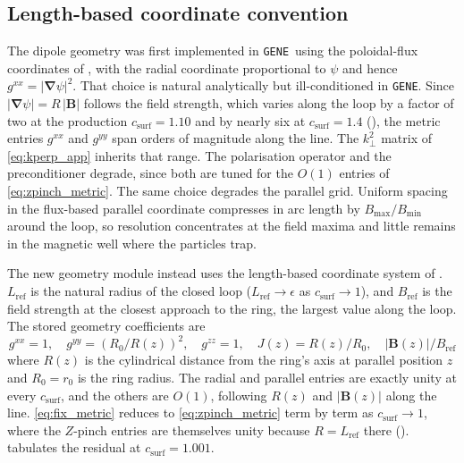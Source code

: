 \documentclass{jpp}
\newcommand{\order}[1]{O\left(#1\right)}
\newcommand{\bB}{\mathbf{B}}
\renewcommand{\vec}[1]{\boldsymbol{#1}}
\newcommand{\vec}[1]{\boldsymbol{#1}}
\newcommand{\grad}{{\vec{\nabla}}}
\newcommand{\kperp}{k_\perp}
\newcommand{\gene}{\texttt{GENE}}
\begin{document}
\subsection{Length-based coordinate convention}\label{app:dpfix_coords}

The dipole geometry was first implemented in \gene\ using the poloidal-flux coordinates of \citet{Kennedy2020}, with the radial coordinate proportional to $\psi$ and hence $g^{xx} = |\grad\psi|^2$. That choice is natural analytically but ill-conditioned in \gene. Since $|\grad\psi| = R\,|\bB|$ follows the field strength, which varies along the loop by a factor of two at the production $c_\mathrm{surf} = 1.10$ and by nearly six at $c_\mathrm{surf} = 1.4$ (), the metric entries $g^{xx}$ and $g^{yy}$ span orders of magnitude along the line. The $\kperp^2$ matrix of \cref{eq:kperp_app} inherits that range. The polarisation operator and the preconditioner degrade, since both are tuned for the $\order{1}$ entries of \cref{eq:zpinch_metric}. The same choice degrades the parallel grid. Uniform spacing in the flux-based parallel coordinate compresses in arc length by $B_\mathrm{max}/B_\mathrm{min}$ around the loop, so resolution concentrates at the field maxima and little remains in the magnetic well where the particles trap.

The new geometry module instead uses the length-based coordinate system of . $L_\mathrm{ref}$ is the natural radius of the closed loop ($L_\mathrm{ref} \to \epsilon$ as $c_\mathrm{surf} \to 1$), and $B_\mathrm{ref}$ is the field strength at the closest approach to the ring, the largest value along the loop. The stored geometry coefficients are
\begin{equation}
g^{xx} = 1, \quad g^{yy} = (R_0/R(z))^2, \quad g^{zz} = 1,
\quad J(z) = R(z)/R_0, \quad |\bB(z)| / B_\mathrm{ref}
\label{eq:fix_metric}
\end{equation}
where $R(z)$ is the cylindrical distance from the ring's axis at parallel position $z$ and $R_0 = r_0$ is the ring radius. The radial and parallel entries are exactly unity at every $c_\mathrm{surf}$, and the others are $\order{1}$, following $R(z)$ and $|\bB(z)|$ along the line. \cref{eq:fix_metric} reduces to \cref{eq:zpinch_metric} term by term as $c_\mathrm{surf} \to 1$, where the $Z$-pinch entries are themselves unity because $R = L_\mathrm{ref}$ there ().  tabulates the residual at $c_\mathrm{surf} = 1.001$.
\end{document}
